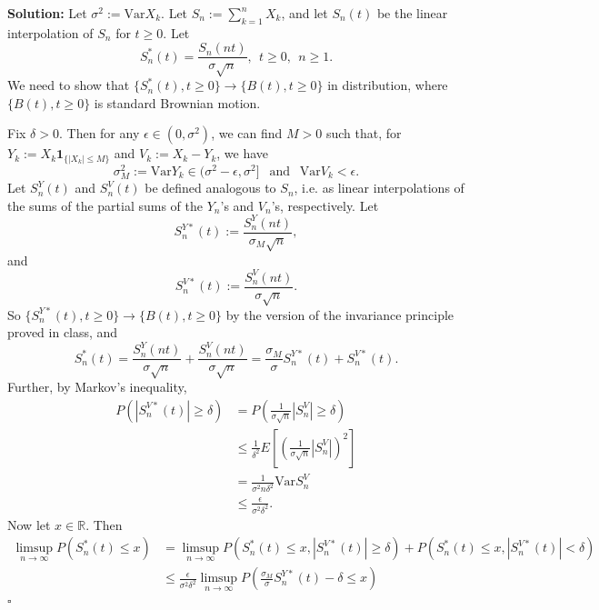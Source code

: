 \documentclass[12pt]{article}
\newcounter{ProofCounter}
\newenvironment{Solution}{\stepcounter{ProofCounter}\textbf{Solution:}}{\hfill$\square$}
\begin{document}
\begin{Solution}
  Let $\sigma^2 := \text{Var}X_k$. Let $S_n := \sum_{k=1}^n X_k$, and let $S_n(t)$ be the linear interpolation of $S_n$ for $t \geq 0$. Let 
  \[
    S_n^*(t) = \frac{S_n(nt)}{\sigma \sqrt{n}}, \ \ t \geq 0,  \ \ n \geq 1.
  \]
  We need to show that $\{ S_n^*(t) , t \geq 0 \} \rightarrow \{ B(t), t \geq 0 \}$ in distribution, where $\{ B(t), t \geq 0\}$ is standard Brownian motion.

  Fix $\delta > 0$. Then for any $\epsilon \in (0, \sigma^2)$, we can find $M > 0$ such that, for $Y_k := X_k \bm{1}_{\{|X_k| \leq M\}}$ and $V_k := X_k - Y_k$, we have
  \[
    \sigma_M^2 := \text{Var} Y_k \in (\sigma^2 - \epsilon, \sigma^2] \ \ \text{ and } \ \ \text{Var}V_k < \epsilon.
  \]
  Let $S_n^{Y}(t)$ and $S_n^{V}(t)$ be defined analogous to $S_n$, i.e. as linear interpolations of the sums of the partial sums of the $Y_n$'s and $V_n$'s, respectively. Let 
  \[
    S_n^{Y*}(t) := \frac{S_n^Y(nt)}{\sigma_M \sqrt{n}},
  \]
  and
  \[
    S_n^{V*}(t) := \frac{S_n^V(nt)}{\sigma\sqrt{n}}.
  \]
  So $\{ S_n^{Y*}(t), t \geq 0\} \rightarrow \{ B(t), t \geq 0\}$ by the version of the invariance principle proved in class, and
  \begin{equation}
    S_n^*(t) = \frac{S_n^Y(nt)}{\sigma \sqrt{n}} + \frac{S_n^V(nt)}{\sigma\sqrt{n}} = \frac{\sigma_M}{\sigma} S_n^{Y*}(t) + S_n^{V*}(t).
    \label{1.1}
  \end{equation}
  Further, by Markov's inequality,
  \begin{align}
    P \left( |S_n^{V*}(t)| \geq \delta \right) & = P \left( \frac{1}{\sigma\sqrt{n}}|S_n^V| \geq \delta \right) \nonumber \\
    & \leq \frac{1}{\delta^2} E \left[ \left( \frac{1}{\sigma \sqrt{n}}|S_n^V| \right)^2 \right] \nonumber \\
    & = \frac{1}{\sigma^2 n\delta^2} \text{Var} S_n^V \nonumber \\
    & \leq \frac{\epsilon}{\sigma^2 \delta^2}.
    \label{1.2}
  \end{align}
  Now let $x \in \mathbb{R}$. Then
  \begin{align}
    \limsup_{n\rightarrow\infty} P(S_n^*(t) \leq x) & = \limsup_{n\rightarrow\infty} P \left( S_n^*(t) \leq x, |S_n^{V*}(t)| \geq \delta \right) + P \left( S_n^*(t) \leq x, |S_n^{V*}(t)| < \delta \right)  \nonumber \\
    & \leq \frac{\epsilon}{\sigma^2 \delta^2} \limsup_{n\rightarrow \infty} P \left( \frac{\sigma_M}{\sigma} S_n^{Y*}(t) - \delta \leq x \right) \nonumber \\

\end{align}
\end{Solution}
\end{document}
